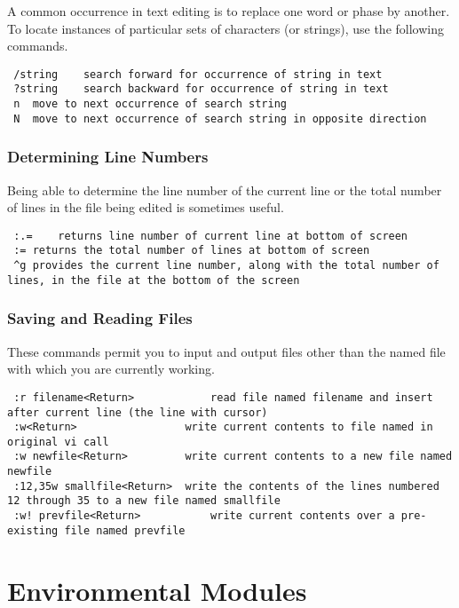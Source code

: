 A common occurrence in text editing is to replace one word or phase by another. To locate instances of particular sets of characters (or strings), use the following commands.

\begin{lstlisting}
 /string	search forward for occurrence of string in text
 ?string	search backward for occurrence of string in text
 n	move to next occurrence of search string
 N	move to next occurrence of search string in opposite direction
\end{lstlisting}

\subsubsection{Determining Line Numbers}

Being able to determine the line number of the current line or the total number of lines in the file being edited is sometimes useful.

\begin{lstlisting}
 :.=	returns line number of current line at bottom of screen
 :=	returns the total number of lines at bottom of screen
 ^g	provides the current line number, along with the total number of lines, in the file at the bottom of the screen
\end{lstlisting}

\subsubsection{Saving and Reading Files}

These commands permit you to input and output files other than the named file with which you are currently working.

\begin{lstlisting}
 :r filename<Return>	        read file named filename and insert after current line (the line with cursor)
 :w<Return>	                write current contents to file named in original vi call
 :w newfile<Return>	        write current contents to a new file named newfile
 :12,35w smallfile<Return>	write the contents of the lines numbered 12 through 35 to a new file named smallfile
 :w! prevfile<Return>	        write current contents over a pre-existing file named prevfile
\end{lstlisting}


\section{Environmental Modules}

